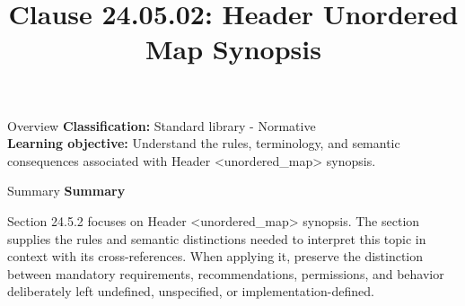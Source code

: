 \documentclass[10pt,letterpaper]{article}
\title{Clause 24.05.02: Header Unordered Map Synopsis}
\author{}
\date{}
\begin{document}
\maketitle
\begin{CornellOverviewBox}{Overview}
\textbf{Classification:} Standard library - Normative\\[2pt]
\textbf{Learning objective:} Understand the rules, terminology, and semantic consequences associated with Header <unordered\_map> synopsis.
\end{CornellOverviewBox}\begin{CornellSummaryBox}{Summary}
{\sffamily\bfseries\color{Accent} Summary}\par\vspace{3pt}Section 24.5.2 focuses on Header <unordered\_map> synopsis. The section supplies the rules and semantic distinctions needed to interpret this topic in context with its cross-references. When applying it, preserve the distinction between mandatory requirements, recommendations, permissions, and behavior deliberately left undefined, unspecified, or implementation-defined.
\end{CornellSummaryBox}
\end{document}
